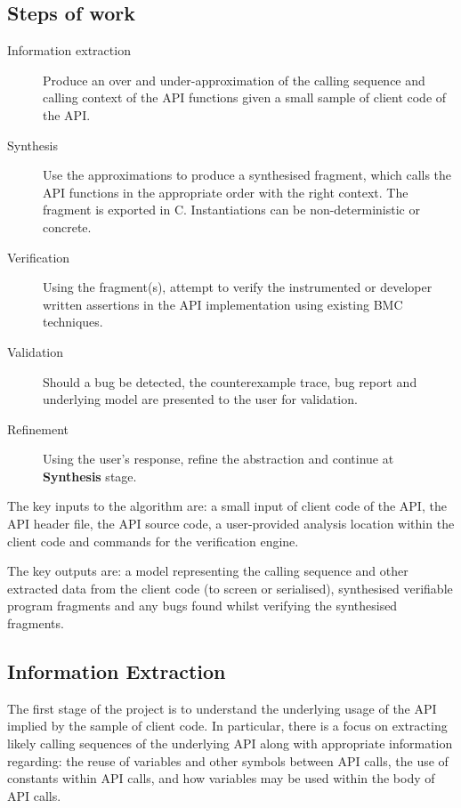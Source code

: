 \documentclass[EPiCempty]{easychair}
\begin{document}
\subsection{Steps of work}
\label{sec:steps}
\begin{description}
	\item[Information extraction]  Produce an over and under-approximation of the calling sequence and calling context of the API functions given a  small sample of client code of the API.
	\item[Synthesis] Use the approximations to produce a synthesised fragment, which calls the API functions in the appropriate order with the right context.  The fragment is exported in C.  Instantiations can be non-deterministic or concrete.
	\item[Verification] Using the fragment(s), attempt to verify the instrumented or developer written assertions in the API implementation using existing BMC techniques.
	\item[Validation]  Should a bug be detected, the counterexample trace, bug report and underlying model are presented to the user for validation.
	\item[Refinement] Using the user's response, refine the abstraction and continue at \textbf{Synthesis} stage.
\end{description}

The key inputs to the algorithm are:  a small input of client code of the API, the API header file, the API source code, a user-provided analysis location within the client code and commands for the verification engine.

The key outputs are: a model representing the calling sequence and other extracted data from the client code (to screen or serialised),  synthesised verifiable program fragments and any bugs found whilst verifying the synthesised fragments.


\subsection{Information Extraction}
\label{sec:information_extraction}
The first stage of the project is to understand the underlying usage of the API implied by the sample of client code.  In particular, there is a focus on extracting likely calling sequences of the underlying API along with appropriate information regarding: the reuse of variables and other symbols between API calls, the use of constants within API calls, and how variables may be used within the body of API calls.
\end{document}
